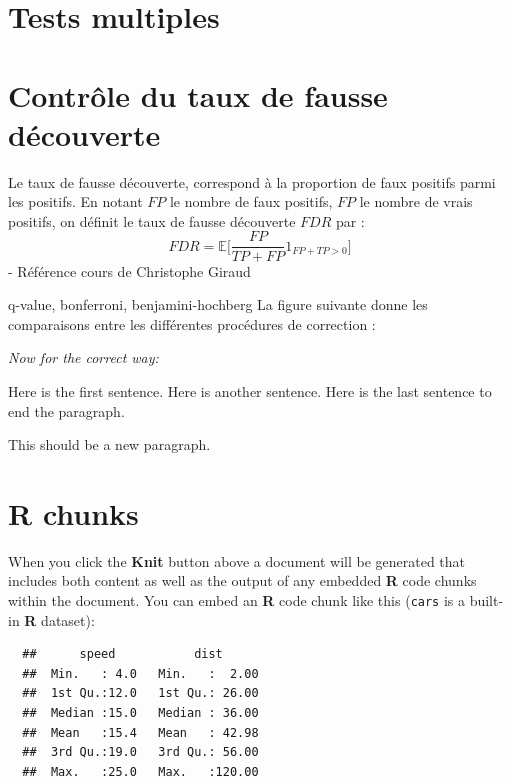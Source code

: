 \documentclass[12pt,twoside]{reedthesis}
\theoremstyle{definition}
\theoremstyle{definition}
\theoremstyle{remark}
\begin{document}
  \section{Tests multiples}\label{tests-multiples}
  
  \section{Contrôle du taux de fausse
  découverte}\label{controle-du-taux-de-fausse-decouverte}
  
  Le taux de fausse découverte, correspond à la proportion de faux
  positifs parmi les positifs. En notant \(FP\) le nombre de faux
  positifs, \(FP\) le nombre de vrais positifs, on définit le taux de
  fausse découverte \(FDR\) par :
  \[ FDR = \mathbb{E}\Big[\frac{FP}{TP + FP} 1_{FP+TP > 0}\Big] \] -
  Référence cours de Christophe Giraud
  
  q-value, bonferroni, benjamini-hochberg La figure suivante donne les
  comparaisons entre les différentes procédures de correction :
  
  \emph{Now for the correct way:}
  
  Here is the first sentence. Here is another sentence. Here is the last
  sentence to end the paragraph.
  
  This should be a new paragraph.
  
  \section{R chunks}\label{r-chunks}
  
  When you click the \textbf{Knit} button above a document will be
  generated that includes both content as well as the output of any
  embedded \textbf{R} code chunks within the document. You can embed an
  \textbf{R} code chunk like this (\texttt{cars} is a built-in \textbf{R}
  dataset):
  
  \begin{Shaded}
  \begin{Highlighting}[]
  \end{Highlighting}
  \end{Shaded}
  
  \begin{verbatim}
  ##      speed           dist       
  ##  Min.   : 4.0   Min.   :  2.00  
  ##  1st Qu.:12.0   1st Qu.: 26.00  
  ##  Median :15.0   Median : 36.00  
  ##  Mean   :15.4   Mean   : 42.98  
  ##  3rd Qu.:19.0   3rd Qu.: 56.00  
  ##  Max.   :25.0   Max.   :120.00
  \end{verbatim}
  
\end{document}
